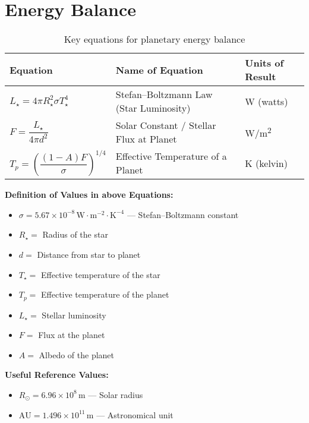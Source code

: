 \documentclass[12pt, a4paper]{article} %
\begin{document}
\section{Energy Balance}

\begin{table}[h!]
\centering
\begin{tabular}{|l|l|l|}
\hline
\textbf{Equation} & \textbf{Name of Equation} & \textbf{Units of Result} \\
\hline
$L_\star = 4\pi R_\star^2 \sigma T_\star^4$ & Stefan–Boltzmann Law (Star Luminosity) & W (watts) \\
\hline
$F = \dfrac{L_\star}{4\pi d^2}$ & Solar Constant / Stellar Flux at Planet & W/m\textsuperscript{2} \\[1ex]
\hline
$T_p = \left( \dfrac{(1 - A) F}{\sigma} \right)^{1/4}$ & Effective Temperature of a Planet & K (kelvin) \\
\hline
\end{tabular}
\caption{Key equations for planetary energy balance}
\end{table}

\textbf{Definition of Values in above Equations:}
\begin{itemize}[noitemsep, topsep=0pt]
    \item \( \sigma = 5.67 \times 10^{-8} \, \text{W} \cdot \text{m}^{-2} \cdot \text{K}^{-4} \) — Stefan–Boltzmann constant
    \item \( R_\star = \) Radius of the star
    \item \( d = \) Distance from star to planet
    \item \( T_\star = \) Effective temperature of the star
    \item \( T_p = \) Effective temperature of the planet
    \item \( L_\star = \) Stellar luminosity
    \item \( F = \) Flux at the planet
    \item \( A = \) Albedo of the planet
\end{itemize}

\textbf{Useful Reference Values:}
\begin{itemize}[noitemsep, topsep=0pt]
    \item \( R_\odot = 6.96 \times 10^8 \, \text{m} \) — Solar radius
    \item \( \text{AU} = 1.496 \times 10^{11} \, \text{m} \) — Astronomical unit
\end{itemize}


\end{document}
